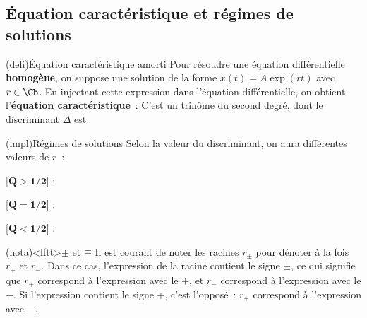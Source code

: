 \documentclass[../../main/main.tex]{subfiles}
\begin{document}
\subsection{Équation caractéristique et régimes de solutions}
\begin{tcb*}[label=def:eqcarac, sidebyside]
	(defi){Équation caractéristique amorti}
	Pour résoudre une équation différentielle \textbf{homogène}, on suppose une
	solution de la forme $x(t) = A\exp(rt)$ avec $r \in \Cb$. En injectant cette
	expression dans l'équation différentielle, on obtient l'\textbf{équation
		caractéristique}~:
	\tcblower
	C'est un trinôme du second degré, dont le discriminant $\Delta$ est
\end{tcb*}

\begin{tcb*}[label=impl:eqcarac](impl){Régimes de solutions}
	Selon la valeur du discriminant, on aura différentes valeurs de $r$~:
	\vspace{-15pt}
	\begin{description}
		\item{}[$\mathbf{Q > 1/2}$] :
		\item{}[$\mathbf{Q = 1/2}$] :
		\item{}[$\mathbf{Q < 1/2}$] :
	\end{description}
\end{tcb*}

\begin{tcb}[label=nota:pm](nota)<lftt>{$\pm$ et $\mp$}
	Il est courant de noter les racines $r_\pm$ pour dénoter à la fois $r_+$ et
	$r_-$. Dans ce cas, l'expression de la racine contient le signe $\pm$, ce
	qui signifie que $r_+$ correspond à l'expression avec le $+$, et $r_-$
	correspond à l'expression avec le $-$.
	\smallbreak
	Si l'expression contient le signe $\mp$, c'est l'opposé~: $r_+$ correspond à
	l'expression avec $-$.
\end{tcb}
\end{document}
